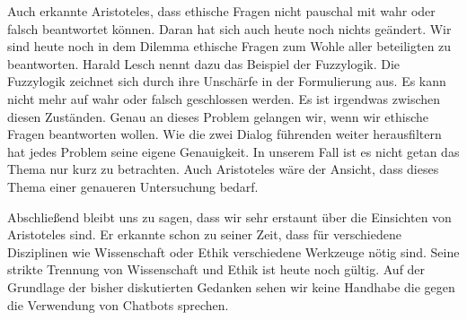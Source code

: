 Auch erkannte Aristoteles, dass ethische Fragen nicht pauschal mit wahr oder falsch beantwortet können. Daran hat sich auch heute noch nichts geändert. Wir sind heute noch in dem Dilemma ethische Fragen zum Wohle aller beteiligten zu beantworten. Harald Lesch nennt dazu das Beispiel der Fuzzylogik. Die Fuzzylogik zeichnet sich durch ihre Unschärfe in der Formulierung aus. Es kann nicht mehr auf wahr oder falsch geschlossen werden. Es ist irgendwas zwischen diesen Zuständen. Genau an dieses Problem gelangen wir, wenn wir ethische Fragen beantworten wollen. \newline
Wie die zwei Dialog führenden weiter herausfiltern hat jedes Problem seine eigene Genauigkeit. In unserem Fall ist es nicht getan das Thema nur kurz zu betrachten. Auch Aristoteles wäre der Ansicht, dass dieses Thema einer genaueren Untersuchung bedarf.

Abschließend bleibt uns zu sagen, dass wir sehr erstaunt über die Einsichten von Aristoteles sind. Er erkannte schon zu seiner Zeit, dass für verschiedene Disziplinen wie Wissenschaft oder Ethik verschiedene Werkzeuge nötig sind. Seine strikte Trennung von Wissenschaft und Ethik ist heute noch gültig. Auf der Grundlage der bisher diskutierten Gedanken sehen wir keine Handhabe die gegen die Verwendung von Chatbots sprechen. 


